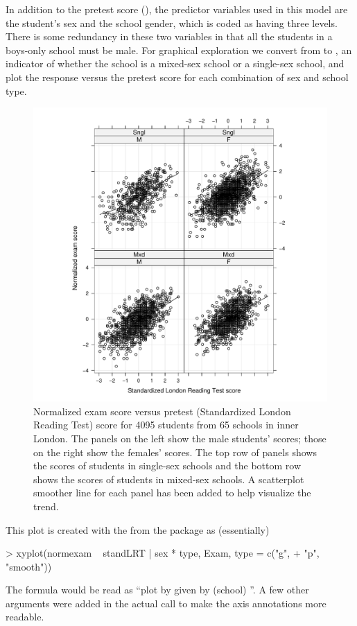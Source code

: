 \documentclass[12pt]{article}
\begin{document}
In addition to the pretest score (), the predictor
variables used in this model are the student's sex and the school
gender, which is coded as having three levels.  There is some
redundancy in these two variables in that all the students in a
boys-only school must be male.  For graphical exploration we convert
from  to , an indicator of whether the school
is a mixed-sex school or a single-sex school, and plot the response
versus the pretest score for each combination of sex and school type.
\begin{figure}[tbp]
  \centering
  \includegraphics[width=\textwidth]{figs/SoftRev-Examplot1}
  \caption{Normalized exam score versus pretest 
    (Standardized London Reading Test) score for 4095 students from 65 schools
    in inner London. The panels on the left show the male students'
    scores; those on the right show the females' scores.  The top row
    of panels shows the scores of students in single-sex schools and
    the bottom row shows the scores of students in mixed-sex
    schools. A scatterplot smoother line for each panel has been added
    to help visualize the trend.}
  \label{fig:Examplot1}
\end{figure}

This plot is created with the  from the 
package as (essentially)
\begin{Schunk}
\begin{Sinput}
> xyplot(normexam ~ standLRT | sex * type, Exam, type = c("g", 
+     "p", "smooth"))
\end{Sinput}
\end{Schunk}
The formula would be read as ``plot  by 
given  by (school) ''.  A few other arguments were
added in the actual call to make the axis annotations more readable.
\end{document}
